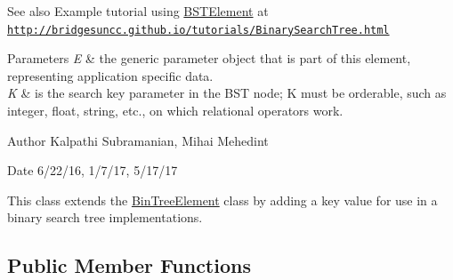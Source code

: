 \begin{DoxySeeAlso}{See also}
Example tutorial using \hyperlink{classbridges_1_1base_1_1_b_s_t_element}{B\+S\+T\+Element} at \href{http://bridgesuncc.github.io/tutorials/BinarySearchTree.html}{\tt http\+://bridgesuncc.\+github.\+io/tutorials/\+Binary\+Search\+Tree.\+html}
\end{DoxySeeAlso}

\begin{DoxyParams}{Parameters}
{\em E} & the generic parameter object that is part of this element, representing application specific data. \\
\hline
{\em K} & is the search key parameter in the B\+ST node; K must be orderable, such as integer, float, string, etc., on which relational operators work.\\
\hline
\end{DoxyParams}
\begin{DoxyAuthor}{Author}
Kalpathi Subramanian, Mihai Mehedint
\end{DoxyAuthor}
\begin{DoxyDate}{Date}
6/22/16, 1/7/17, 5/17/17
\end{DoxyDate}
This class extends the \hyperlink{classbridges_1_1base_1_1_bin_tree_element}{Bin\+Tree\+Element} class by adding a \textquotesingle{}key\textquotesingle{} value for use in a binary search tree implementations. \subsection*{Public Member Functions}
